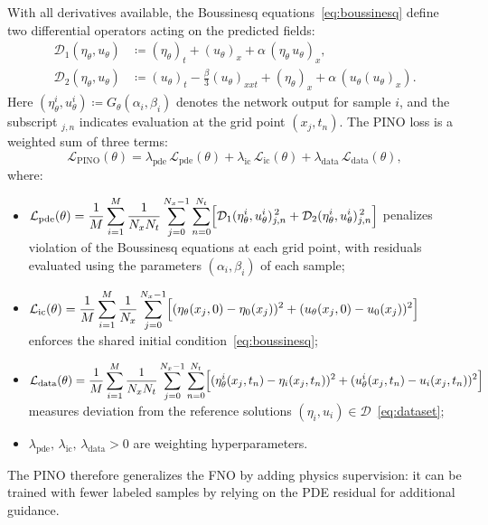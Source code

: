 With all derivatives available, the Boussinesq equations~\eqref{eq:boussinesq} define two differential operators acting on the predicted fields:
\begin{align}
    \mathcal{D}_1(\eta_\theta, u_\theta) &\coloneqq (\eta_\theta)_t + (u_\theta)_x
               + \alpha\,(\eta_\theta\,u_\theta)_x, \label{eq:res1} \\
    \mathcal{D}_2(\eta_\theta, u_\theta) &\coloneqq (u_\theta)_t - \tfrac{\beta}{3}(u_\theta)_{xxt}
               + (\eta_\theta)_x + \alpha\,(u_\theta(u_\theta)_x). \label{eq:res2}
\end{align}
Here $(\eta_\theta^i, u_\theta^i) \coloneqq G_\theta(\alpha_i, \beta_i)$ denotes the network output for sample $i$, and the subscript $_{j,n}$ indicates evaluation at the grid point $(x_j, t_n)$. The PINO loss is a weighted sum of three terms:
\begin{equation}\label{eq:pino_loss}
    \mathcal{L}_{\text{PINO}}(\theta) = \lambda_{\text{pde}}\,\mathcal{L}_{\text{pde}}(\theta)
    + \lambda_{\text{ic}}\,\mathcal{L}_{\text{ic}}(\theta)
    + \lambda_{\text{data}}\,\mathcal{L}_{\text{data}}(\theta),
\end{equation}
\noindent where:
\begin{itemize}
    \item $\mathcal{L}_{\text{pde}}(\theta) = \dfrac{1}{M}\displaystyle\sum_{i=1}^{M}\dfrac{1}{N_x N_t}\displaystyle\sum_{j=0}^{N_x-1}\sum_{n=0}^{N_t}
          \Bigl[\mathcal{D}_1(\eta_\theta^i, u_\theta^i)_{j,n}^{\,2} + \mathcal{D}_2(\eta_\theta^i, u_\theta^i)_{j,n}^{\,2}\Bigr]$
          penalizes violation of the Boussinesq equations at each grid point, with residuals evaluated using the parameters $(\alpha_i,\beta_i)$ of each sample;

    \item $\mathcal{L}_{\text{ic}}(\theta) = \dfrac{1}{M}\displaystyle\sum_{i=1}^{M}\dfrac{1}{N_x}\displaystyle\sum_{j=0}^{N_x-1}
          \Bigl[(\eta_\theta(x_j,0) - \eta_0(x_j))^2 +
          (u_\theta(x_j,0) - u_0(x_j))^2\Bigr]$
          enforces the shared initial condition~\eqref{eq:boussinesq};

    \item $\mathcal{L}_{\text{data}}(\theta) = \dfrac{1}{M}\displaystyle\sum_{i=1}^{M}\dfrac{1}{N_x N_t}\displaystyle\sum_{j=0}^{N_x-1}\sum_{n=0}^{N_t}
          \Bigl[(\eta_\theta^i(x_j,t_n) - \eta_i(x_j,t_n))^2 +
          (u_\theta^i(x_j,t_n) - u_i(x_j,t_n))^2\Bigr]$
          measures deviation from the reference solutions $(\eta_i,u_i) \in \mathcal{D}$~\eqref{eq:dataset};

    \item $\lambda_{\text{pde}},\, \lambda_{\text{ic}},\, \lambda_{\text{data}} > 0$
          are weighting hyperparameters.
\end{itemize}
The PINO therefore generalizes the FNO by adding physics supervision: it can be trained with fewer labeled samples by relying on the PDE residual for additional guidance.
